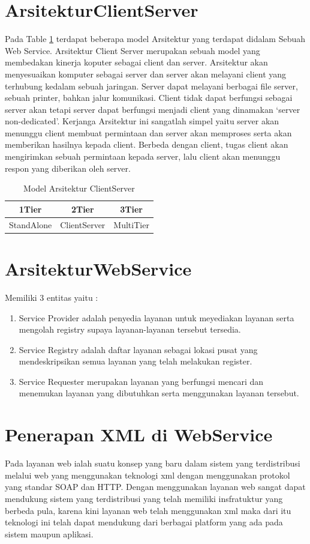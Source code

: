 
\section{ArsitekturClientServer}
    Pada Table \ref{table} terdapat beberapa model Arsitektur yang terdapat didalam Sebuah Web Service. 
Arsitektur Client Server merupakan  sebuah model yang membedakan kinerja koputer sebagai client dan server. 
Arsitektur akan menyesuaikan komputer sebagai server dan server akan melayani client yang terhubung kedalam sebuah jaringan.
Server dapat melayani berbagai file server, sebuah printer, bahkan jalur komunikasi.
Client tidak dapat berfungsi sebagai server akan tetapi server dapat berfungsi menjadi client yang dinamakan `server non-dedicated'.
Kerjanga Arsitektur ini sangatlah simpel yaitu server akan menunggu client membuat permintaan dan server akan memproses serta
akan memberikan hasilnya kepada client. Berbeda dengan client, tugas client akan mengirimkan sebuah permintaan kepada server, lalu
client akan menunggu respon yang diberikan oleh server.

\begin{table}[ht]
\caption{Model Arsitektur Client\-Server}
\centering
\begin{tabular}{ccc}
\hline
1\-Tier&2\-Tier&3\-Tier\\
\hline
Stand\-Alone&Client\-Server&Multi\-Tier\\
\hline
\end{tabular}
\label{table}
\end{table}

\section{ArsitekturWebService}
Memiliki 3 entitas yaitu :
\begin{enumerate}
\item Service Provider adalah penyedia layanan untuk meyediakan layanan serta mengolah registry supaya layanan-layanan tersebut tersedia.
\item Service Registry adalah daftar layanan sebagai lokasi pusat yang mendeskripsikan semua layanan yang telah melakukan register.
\item Service Requester merupakan layanan yang berfungsi mencari dan menemukan layanan yang dibutuhkan serta menggunakan layanan tersebut.
\end{enumerate}

\section{Penerapan XML di WebService}
Pada layanan web ialah suatu konsep yang baru dalam sistem yang terdistribusi melalui web yang menggunakan teknologi xml dengan 
menggunakan protokol yang standar SOAP dan HTTP. Dengan menggunakan layanan web sangat dapat mendukung sistem yang terdistribusi 
yang telah memiliki insfratuktur yang berbeda pula, karena kini layanan web telah menggunakan xml maka dari itu teknologi ini telah dapat 
mendukung dari berbagai platform yang ada pada sistem maupun aplikasi.

